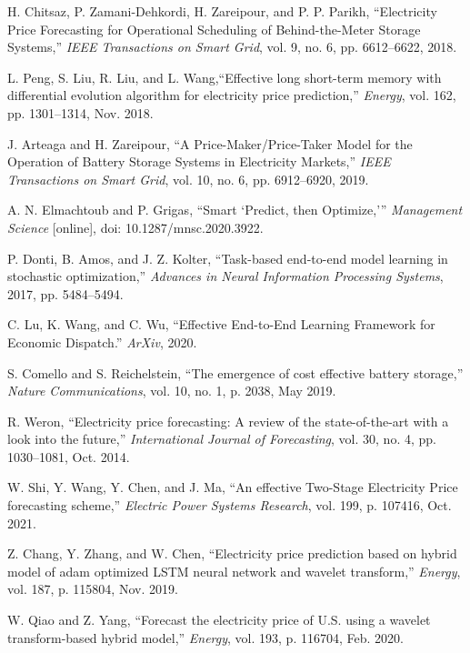\documentclass[journal]{IEEEtran}
\begin{document}
\begin{thebibliography}{2}

H. Chitsaz, P. Zamani-Dehkordi, H. Zareipour, and P. P. Parikh, ``Electricity Price Forecasting for Operational Scheduling of Behind-the-Meter Storage Systems,'' \emph{IEEE Transactions on Smart Grid}, vol. 9, no. 6, pp. 6612–6622, 2018.

L. Peng, S. Liu, R. Liu, and L. Wang,``Effective long short-term memory with differential evolution algorithm for electricity price prediction,” \emph{Energy}, vol. 162, pp. 1301–1314, Nov. 2018.

J. Arteaga and H. Zareipour, “A Price-Maker/Price-Taker Model for the Operation of Battery Storage Systems in Electricity Markets,” \emph{IEEE Transactions on Smart Grid}, vol. 10, no. 6, pp. 6912–6920, 2019.

A. N. Elmachtoub and P. Grigas, ``Smart `Predict, then Optimize,’” \emph{Management Science} [online], doi: 10.1287/mnsc.2020.3922.

P. Donti, B. Amos, and J. Z. Kolter, “Task-based end-to-end model learning in stochastic optimization,” \emph{Advances in Neural Information Processing Systems}, 2017, pp. 5484–5494.

C. Lu, K. Wang, and C. Wu, “Effective End-to-End Learning Framework for Economic Dispatch.” \emph{ArXiv}, 2020.


S. Comello and S. Reichelstein, “The emergence of cost effective battery storage,” \emph{Nature Communications}, vol. 10, no. 1, p. 2038, May 2019.

R. Weron, ``Electricity price forecasting: A review of the state-of-the-art with a look into the future,” \emph{International Journal of Forecasting}, vol. 30, no. 4, pp. 1030–1081, Oct. 2014.


W. Shi, Y. Wang, Y. Chen, and J. Ma, “An effective Two-Stage Electricity Price forecasting scheme,” \emph{Electric Power Systems Research}, vol. 199, p. 107416, Oct. 2021.

Z. Chang, Y. Zhang, and W. Chen, “Electricity price prediction based on hybrid model of adam optimized LSTM neural network and wavelet transform,” \emph{Energy}, vol. 187, p. 115804, Nov. 2019.

W. Qiao and Z. Yang, “Forecast the electricity price of U.S. using a wavelet transform-based hybrid model,” \emph{Energy}, vol. 193, p. 116704, Feb. 2020.


\end{thebibliography}
\end{document}
